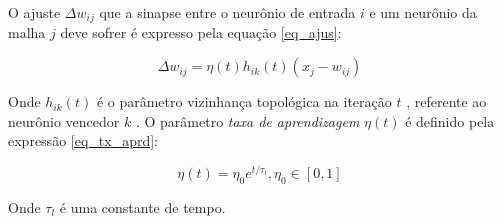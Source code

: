 O ajuste $ \Delta w_{ij} $ que a sinapse entre o neurônio de entrada $ i $ e
um neurônio da malha $ j $ deve sofrer é expresso pela equação \ref{eq_ajus}:

\begin{equation}\label{eq_ajus}
\Delta w_{ij} = \eta(t) h_{ik}(t) (x_j - w_{ij})
\end{equation}

Onde $ h_{ik}(t) $ é o parâmetro vizinhança topológica na iteração $ t $ ,
referente ao neurônio vencedor $ k $ . O
parâmetro \textit{taxa de aprendizagem} $ \eta(t) $ é definido pela
expressão \ref{eq_tx_aprd}:

\begin{equation}\label{eq_tx_aprd}
\eta(t) = \eta_0 e^{ t / \tau_l }, \eta_0 \in [0, 1]
\end{equation}

Onde $ \tau_l $ é uma constante de tempo.

